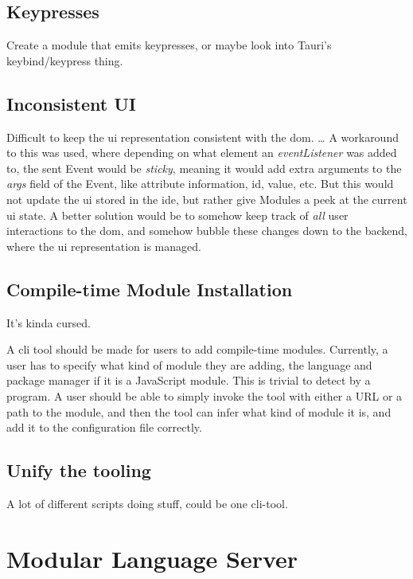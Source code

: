 \subsection{Keypresses}

Create a module that emits keypresses, or maybe look into Tauri's
keybind/keypress thing.

\subsection{Inconsistent UI}

Difficult to keep the \gls*{ui} representation consistent with the \gls*{dom}.
\dots
A workaround to this was used, where depending on what element an
\textit{eventListener} was added to, the sent Event would be \textit{sticky},
meaning it would add extra arguments to the \textit{args} field of the Event,
like attribute information, id, value, etc. But this would not update the
\gls*{ui} stored in the \gls*{ide}, but rather give Modules a peek at the current
\gls*{ui} state. A better solution would be to somehow keep track of \textit{all}
user interactions to the \gls*{dom}, and somehow bubble these changes down to the
backend, where the \gls*{ui} representation is managed.

\subsection{Compile-time Module Installation}

It's kinda cursed.

A \gls{cli} tool should be made for users to add compile-time modules.
Currently, a user has to specify what kind of module they are adding, the
language and package manager if it is a JavaScript module. This is trivial to
detect by a program. A user should be able to simply invoke the tool with
either a URL or a path to the module, and then the tool can infer what kind of
module it is, and add it to the configuration file correctly.

\subsection{Unify the tooling}

A lot of different scripts doing stuff, could be one \gls*{cli}-tool.

\section{Modular Language Server}

